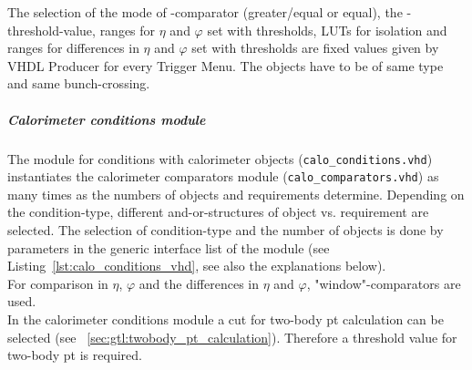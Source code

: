 The selection of the mode of \et-comparator (greater/equal or equal), the \et-threshold-value, ranges for $\eta$ and $\varphi$ set with thresholds, LUTs for isolation and ranges for differences in $\eta$ and $\varphi$ set with thresholds are fixed values given by VHDL Producer for every Trigger Menu.
The objects have to be of same type and same bunch-crossing.

\subparagraph{Calorimeter conditions module}\label{sec:gtl:calo_conditions_module}

The module for conditions with calorimeter objects (\texttt{calo\_conditions.vhd}) instantiates the calorimeter comparators module (\texttt{calo\_comparators.vhd}) as many times as
the numbers of objects and requirements determine. Depending on the condition-type, different and-or-structures of object vs. requirement are selected.
The selection of condition-type and the number of objects is done by parameters in the generic interface list of the module (see Listing~\ref{lst:calo_conditions_vhd},
see also the explanations below).\\
For comparison in $\eta$, $\varphi$ and the differences in $\eta$ and $\varphi$, "window"-comparators are used.\\
In the calorimeter conditions module a cut for two-body pt calculation can be selected (see ~\ref{sec:gtl:twobody_pt_calculation}). Therefore a threshold value for two-body pt is required.\\



